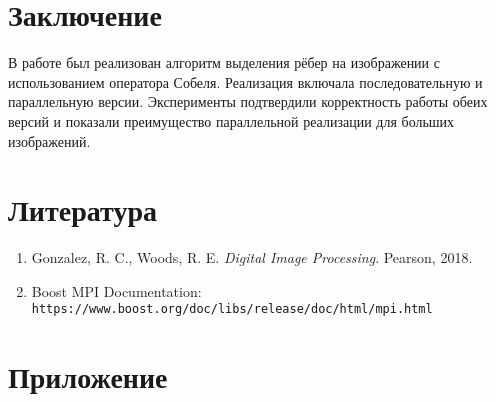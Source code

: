 \documentclass[12pt]{article}
\begin{document}
\newpage
\section*{Заключение}
В работе был реализован алгоритм выделения рёбер на изображении с использованием оператора Собеля. Реализация включала последовательную и параллельную версии. Эксперименты подтвердили корректность работы обеих версий и показали преимущество параллельной реализации для больших изображений.

\newpage
\section*{Литература}
\begin{enumerate}
    \item Gonzalez, R. C., Woods, R. E. \textit{Digital Image Processing}. Pearson, 2018.
    \item Boost MPI Documentation: \texttt{https://www.boost.org/doc/libs/release/doc/html/mpi.html}
\end{enumerate}

\newpage
\section*{Приложение}
\end{document}
